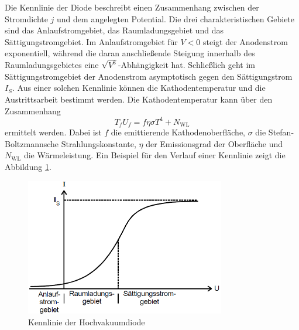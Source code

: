 Die Kennlinie der Diode beschreibt einen Zusammenhang zwischen der Stromdichte $j$ und dem angelegten Potential. Die drei charakteristischen 
Gebiete sind das Anlaufstromgebiet, das Raumladungsgebiet und das Sättigungstromgebiet. Im Anlaufstromgebiet für $V < 0$ steigt der Anodenstrom
exponentiell, während die daran anschließende Steigung innerhalb des Raumladungsgebietes eine $\sqrt{V^3}$-Abhängigkeit hat. Schließlich geht 
im Sättigungstromgebiet der Anodenstrom asymptotisch gegen den Sättigungstrom $I_S$.
Aus einer solchen Kennlinie können die Kathodentemperatur und die Austrittsarbeit bestimmt werden.
Die Kathodentemperatur kann über den Zusammenhang 
\begin{equation}
    T_f U_f = f \eta \sigma T^4 + N_\text{WL}
    \label{eqn:T} 
\end{equation} 
ermittelt werden. Dabei ist $f$ die emittierende Kathodenoberfläche, $\sigma$ die Stefan-Boltzmannsche Strahlungskonstante, $\eta$ der 
Emissionsgrad der Oberfläche und $N_\text{WL} $ die Wärmeleistung. 
Ein Beispiel für den Verlauf einer Kennlinie zeigt die 
Abbildung \ref{fig:kennlinie}. 
\begin{figure}
    \centering
    \includegraphics[height=6cm]{data/kennlinie.png}
    \caption{Kennlinie der Hochvakuumdiode}
    \label{fig:kennlinie}
\end{figure}
\FloatBarrier

